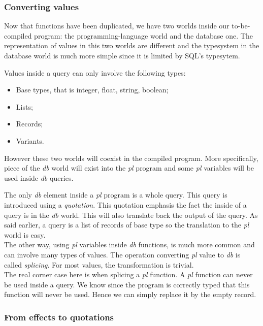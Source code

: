 \documentclass[11pt]{article}
\newcommand\mysc[1]{{\rmfamily\textsc{#1}}\xspace}
\newcommand\sql{\mysc{SQL}}
\newcommand\effect[1]{{\em #1}}
\begin{document}
\subsubsection{Converting values}

Now that functions have been duplicated, we have two worlds inside our to-be-compiled program: the programming-language world and the database one. The representation of values in this two worlds are different and the typesystem in the database world is much more simple since it is limited by \sql's typesytem. 

Values inside a query can only involve the following types:
\begin{itemize}
\item Base types, that is integer, float, string, boolean;
\item Lists;
\item Records;
\item Variants.
\end{itemize}

However these two worlds will coexist in the compiled program. More specifically, piece of the \effect{db} world will exist into the \effect{pl} program and some \effect{pl} variables will be used inside \effect{db} queries. 

The only \effect{db} element inside a \effect{pl} program is a whole query. This query is introduced using a \emph{quotation}. This quotation emphasis the fact the inside of a query is in the \effect{db} world. This will also translate back the output of the query. As said earlier, a query is a list of records of base type so the translation to the \effect{pl} world is easy.\\

The other way, using \effect{pl} variables inside \effect{db} functions, is much more common and can involve many types of values. 
The operation converting \effect{pl} value to \effect{db} is called \emph{splicing}. For most values, the transformation is trivial.\\
 The real corner case here is when splicing a \effect{pl} function. A \effect{pl} function can never be used inside a query. We know since the program is correctly typed that this function will never be used. Hence we can simply replace it by the empty record.

\subsubsection{From effects to quotations}
\end{document}
